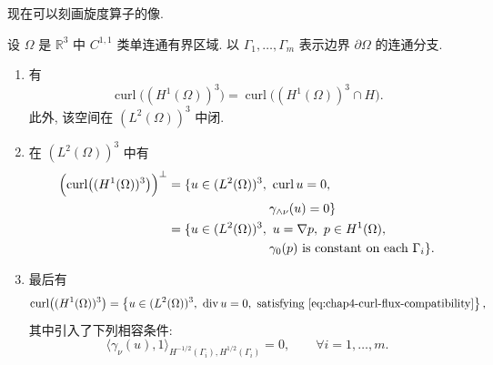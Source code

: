 现在可以刻画旋度算子的像.

\begin{Theorem}
\label{thm:chap4-curl-image-characterization}
设 $\Omega$ 是 $\mathbb R^3$ 中 $C^{1,1}$ 类单连通有界区域. 以
$\Gamma_1,\ldots,\Gamma_m$ 表示边界 $\partial\Omega$ 的连通分支.
\begin{enumerate}
 \item 有
 \begin{equation}
  \operatorname{curl}\bigl((H^1(\Omega))^3\bigr)
  =\operatorname{curl}\bigl((H^1(\Omega))^3\cap H\bigr).
  \label{eq:chap4-curl-image-leray-space}
 \end{equation}
 此外, 该空间在 $(L^2(\Omega))^3$ 中闭.

 \item 在 $(L^2(\Omega))^3$ 中有
 \begin{equation}
 \begin{aligned}
 \Bigl(\operatorname{curl}\bigl((H^1(\Omega))^3\bigr)\Bigr)^\perp
 &=\{u\in(L^2(\Omega))^3,\ \operatorname{curl}u=0,\\
 &\hspace{8em}\gamma_{\wedge\nu}(u)=0\}\\
 &=\{u\in(L^2(\Omega))^3,\ u=\nabla p,\ p\in H^1(\Omega),\\
 &\hspace{8em}\gamma_0(p)\text{ is constant on each }\Gamma_i\}.
 \end{aligned}
 \label{eq:chap4-curl-image-orthogonal}
 \end{equation}

 \item 最后有
 \[
  \operatorname{curl}\bigl((H^1(\Omega))^3\bigr)
  =\left\{u\in(L^2(\Omega))^3,
  \ \operatorname{div}u=0,\ \text{satisfying \eqref{eq:chap4-curl-flux-compatibility}}\right\},
 \]
 其中引入了下列相容条件:
 \begin{equation}
  \langle\gamma_\nu(u),1\rangle_{H^{-1/2}(\Gamma_i),H^{1/2}(\Gamma_i)}=0,
  \qquad\forall i=1,\ldots,m.
  \label{eq:chap4-curl-flux-compatibility}
 \end{equation}
\end{enumerate}
\end{Theorem}


